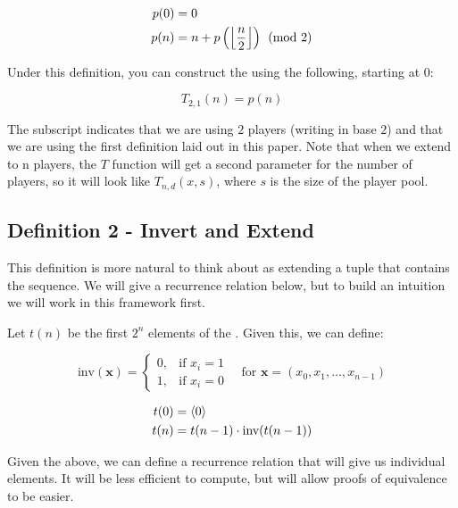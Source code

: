 \documentclass[conference]{IEEEtran}
\begin{document}
\begin{equation}
    \begin{aligned}
        p(0) &= 0 \\
        p(n) &= n + p\left(\left\lfloor \dfrac{n}{2} \right\rfloor\right) \pmod{2}
    \end{aligned}
\end{equation}

Under this definition, you can construct the \TMS using the following, starting at $0$:

\begin{equation}
    T_{2,1}(n) = p(n)
\end{equation}

The subscript indicates that we are using $2$ players (writing in base $2$) and that we are using the first definition laid out in this paper. Note that when we extend to n players, the $T$ function will get a second parameter for the number of players, so it will look like $T_{n,d}(x, s)$, where $s$ is the size of the player pool.

\subsection{Definition 2 - Invert and Extend}

This definition is more natural to think about as extending a tuple that contains the sequence. We will give a recurrence relation below, but to build an intuition we will work in this framework first.

Let $t(n)$ be the first $2^n$ elements of the \TMS. Given this, we can define:

\begin{equation}
    \text{inv}(\mathbf{x}) = \begin{cases}
        0, & \text{if } x_i = 1 \\
        1, & \text{if } x_i = 0
    \end{cases} \quad \text{for } \mathbf{x} = (x_0, x_1, \ldots, x_{n-1})
\end{equation}

\begin{equation}
    \begin{aligned}
        t(0) &= \langle 0 \rangle \\
        t(n) &= t(n - 1) \cdot \text{inv}(t(n - 1))
    \end{aligned}
\end{equation}

Given the above, we can define a recurrence relation that will give us individual elements. It will be less efficient to compute, but will allow proofs of equivalence to be easier.
\end{document}
